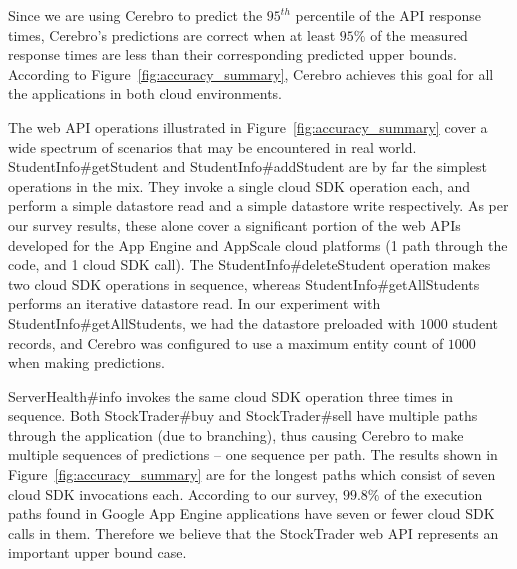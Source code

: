 Since we are using Cerebro to predict the $95^{th}$ percentile of the API
response times, Cerebro's predictions are correct when at 
least $95\%$ of the measured response times are
less than their corresponding predicted upper bounds. According to
Figure~\ref{fig:accuracy_summary}, Cerebro achieves this goal for all the
applications in both cloud environments. 

The web API operations illustrated in Figure~\ref{fig:accuracy_summary} cover
a wide spectrum of scenarios that may be encountered in real world.
StudentInfo\#getStudent and StudentInfo\#addStudent are by far the simplest
operations in the mix. They invoke a single cloud SDK operation each, and
perform a simple datastore read and a simple datastore write respectively. As
per our survey results, these alone cover a significant portion of the web
APIs developed for the App Engine and AppScale cloud platforms (1 path through
the code, and 1 cloud SDK call).  The StudentInfo\#deleteStudent operation
makes two cloud SDK operations in sequence, whereas
StudentInfo\#getAllStudents performs an iterative datastore read.  In our
experiment with StudentInfo\#getAllStudents, we had the datastore preloaded
with $1000$ student records, and Cerebro was configured to use a maximum entity
count of $1000$ when making predictions.

ServerHealth\#info invokes the same cloud SDK operation three times in
sequence. Both StockTrader\#buy and StockTrader\#sell have multiple paths
through the application 
(due to branching), thus causing Cerebro to make multiple
sequences of predictions -- one sequence per path. The results shown in
Figure~\ref{fig:accuracy_summary} are for the longest paths which consist of
seven cloud SDK invocations each. According to our survey, $99.8\%$ of the
execution paths found in Google App Engine applications have seven or 
fewer cloud SDK
calls in them. Therefore we believe that the StockTrader web API
represents an important upper bound case. 

